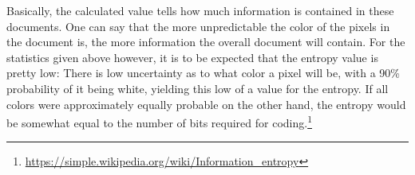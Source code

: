 \documentclass[a4paper,twocolumn]{article}
\begin{document}
	Basically, the calculated value tells how much information is contained in these documents. One can say that the more unpredictable the color of the pixels in the document is, the more information the overall document will contain. For the statistics given above however, it is to be expected that the entropy value is pretty low: There is low uncertainty as to what color a pixel will be, with a 90\% probability of it being white, yielding this low of a value for the entropy. If all colors were approximately equally probable on the other hand, the entropy would be somewhat equal to the number of bits required for coding.\footnote{\url{https://simple.wikipedia.org/wiki/Information_entropy}}
	

	
\end{document}
